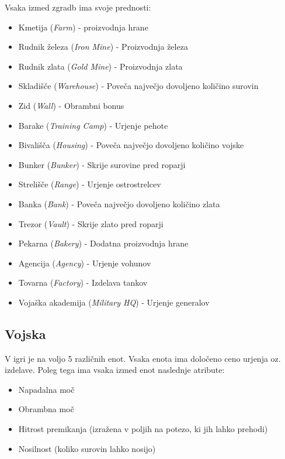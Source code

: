 \documentclass[a4paper, 16pt]{article}
\begin{document}
Vsaka izmed zgradb ima svoje prednosti:
\begin{itemize}
    \item Kmetija (\textit{Farm}) - proizvodnja hrane 
    \item Rudnik železa (\textit{Iron Mine}) - Proizvodnja železa
    \item Rudnik zlata (\textit{Gold Mine}) - Proizvodnja zlata
    \item Skladišče (\textit{Warehouse}) - Poveča največjo dovoljeno količino surovin
    \item Zid (\textit{Wall}) - Obrambni bonus
    \item Barake (\textit{Training Camp}) - Urjenje pehote   
    \item Bivališča (\textit{Housing}) - Poveča največjo dovoljeno količino vojske
    \item Bunker (\textit{Bunker}) - Skrije surovine pred roparji
    \item Strelišče (\textit{Range}) - Urjenje ostrostrelcev
    \item Banka (\textit{Bank}) - Poveča največjo dovoljeno količino zlata
    \item Trezor (\textit{Vault}) - Skrije zlato pred roparji
    \item Pekarna (\textit{Bakery}) - Dodatna proizvodnja hrane
    \item Agencija (\textit{Agency}) - Urjenje vohunov
    \item Tovarna (\textit{Factory}) - Izdelava tankov
    \item Vojaška akademija (\textit{Military HQ}) - Urjenje generalov
\end{itemize}

\subsection{Vojska}

V igri je na voljo 5 različnih enot. Vsaka enota ima določeno ceno urjenja oz. izdelave. Poleg tega ima vsaka izmed enot naslednje atribute:
\begin{itemize}
    \item Napadalna moč
    \item Obrambna moč
    \item Hitrost premikanja (izražena v poljih na potezo, ki jih lahko prehodi)
    \item Nosilnost (koliko surovin lahko nosijo)
\end{itemize}
\end{document}
